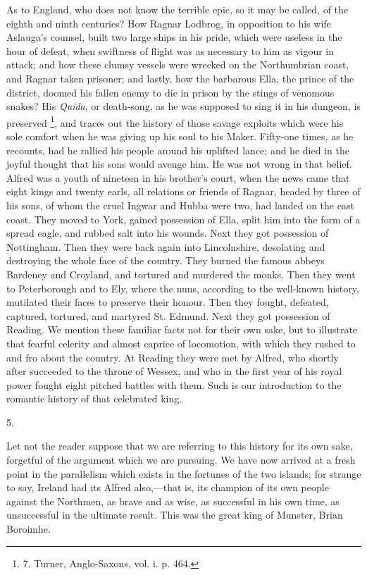 As to England, who does not
know the terrible epic, so it may be called, of the eighth and ninth
centuries? How Ragnar Lodbrog, in opposition to his wife Aslauga's
counsel, built two large ships in his pride, which were useless in the
hour of defeat, when swiftness of flight was as necessary to him as
vigour in attack; and how these clumsy vessels were wrecked on the
Northumbrian coast, and Ragnar taken prisoner; and lastly, how
the barbarous Ella, the prince of the district, doomed his fallen
enemy to die in prison by the stings of venomous snakes? His \emph{Quida},
or death-song, as he was supposed to sing it in his dungeon, is
preserved \footnote{7.
Turner, Anglo-Saxons, vol. i. p. 464.}, and traces out
the history of those savage exploits which were his sole comfort when
he was giving up his soul to his Maker. Fifty-one times, as he
recounts, had he rallied his people around his uplifted lance; and he
died in the joyful thought that his sons would avenge him. He was not
wrong in that belief. Alfred was a youth of nineteen in his brother's
court, when the news came that eight kings and twenty earls, all
relations or friends of Ragnar, headed by three of his sons, of whom
the cruel Ingwar and Hubba were two, had landed on the east coast.
They moved to York, gained possession of Ella, split him into the form
of a spread eagle, and rubbed salt into his wounds. Next they got
possession of Nottingham. Then they were back again into Lincolnshire,
desolating and destroying the whole face of the country. They burned
the famous abbeys Bardeney and Croyland, and tortured and murdered the
monks. Then they went to Peterborough and to Ely, where the nuns,
according to the well-known history, mutilated their faces to preserve
their honour. Then they fought, defeated, captured, tortured, and
martyred St. Edmund. Next they got possession of Reading. We mention
these familiar facts not for their own sake, but to illustrate that
fearful celerity and almost caprice of locomotion, with which they
rushed to and fro about the country. At Reading they were met by
Alfred, who shortly after succeeded to the throne of Wessex, and who
in the first year of his royal power fought eight pitched battles with
them. Such is our introduction to the romantic history of that
celebrated king.

5.

Let not the reader suppose
that we are referring to this history for its own sake, forgetful of
the argument which we are pursuing. We have now arrived at a fresh
point in the parallelism which exists in the fortunes of the two
islands; for strange to say, Ireland had its Alfred also,—that is,
its champion of its own people against the Northmen, as brave and as
wise, as successful in his own time, as unsuccessful in the ultimate
result. This was the great king of Munster, Brian Boroimhe.

